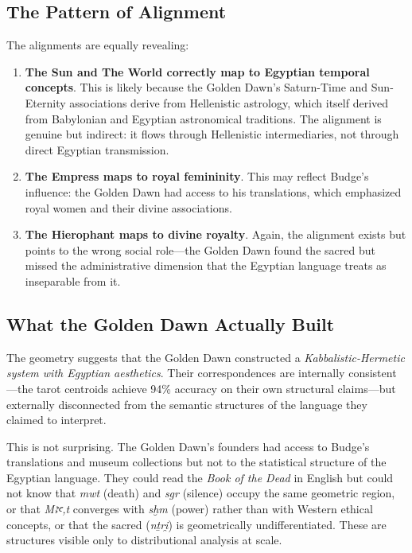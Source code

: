 \documentclass[11pt, a4paper]{article}
\begin{document}
\subsection{The Pattern of Alignment}

The alignments are equally revealing:

\begin{enumerate}
    \item \textbf{The Sun and The World correctly map to Egyptian temporal concepts}. This is likely because the Golden Dawn's Saturn-Time and Sun-Eternity associations derive from Hellenistic astrology, which itself derived from Babylonian and Egyptian astronomical traditions. The alignment is genuine but indirect: it flows through Hellenistic intermediaries, not through direct Egyptian transmission.

    \item \textbf{The Empress maps to royal femininity}. This may reflect Budge's influence: the Golden Dawn had access to his translations, which emphasized royal women and their divine associations.

    \item \textbf{The Hierophant maps to divine royalty}. Again, the alignment exists but points to the wrong social role---the Golden Dawn found the sacred but missed the administrative dimension that the Egyptian language treats as inseparable from it.
\end{enumerate}

\subsection{What the Golden Dawn Actually Built}

The geometry suggests that the Golden Dawn constructed a \textit{Kabbalistic-Hermetic system with Egyptian aesthetics}. Their correspondences are internally consistent---the tarot centroids achieve 94\% accuracy on their own structural claims---but externally disconnected from the semantic structures of the language they claimed to interpret.

This is not surprising. The Golden Dawn's founders had access to Budge's translations and museum collections but not to the statistical structure of the Egyptian language. They could read the \textit{Book of the Dead} in English but could not know that \textit{mwt} (death) and \textit{sgr} (silence) occupy the same geometric region, or that \textit{Mꜣꜥ,t} converges with \textit{sḫm} (power) rather than with Western ethical concepts, or that the sacred (\textit{nṯri̯}) is geometrically undifferentiated. These are structures visible only to distributional analysis at scale.
\end{document}
